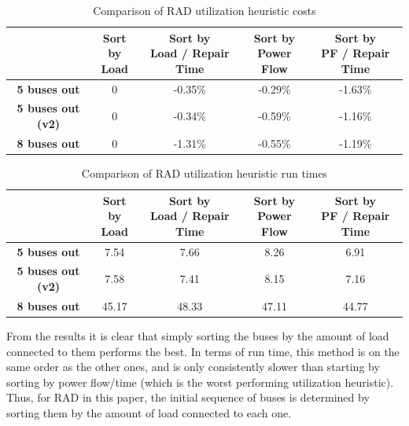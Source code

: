 \documentclass[12pt]{article}
\begin{document}
\begin{table}[ht]
    \centering
    \begin{tabular}{|c|c|c|c|c|}
        \hline
        & \makecell{Sort by \\ Load} 
        & \makecell{Sort by \\ Load / Repair Time} 
        & \makecell{Sort by \\ Power Flow} 
        & \makecell{Sort by \\ PF / Repair Time} \\
        \hline
        \textbf{5 buses out} & 0 & -0.35\% & -0.29\% & -1.63\% \\
        \hline
        \textbf{5 buses out (v2)} & 0 & -0.34\% & -0.59\% & -1.16\% \\
        \hline
        \textbf{8 buses out} & 0 & -1.31\% & -0.55\% & -1.19\% \\
        \hline
    \end{tabular}
    \caption{Comparison of RAD utilization heuristic costs}
    \label{tab:rad_results}
\end{table}

\begin{table}[ht]
    \centering
    \renewcommand{\arraystretch}{1.2} %
    \begin{tabular}{|c|c|c|c|c|}
        \hline
        & \makecell{Sort by \\ Load} 
        & \makecell{Sort by \\ Load / Repair Time} 
        & \makecell{Sort by \\ Power Flow} 
        & \makecell{Sort by \\ PF / Repair Time} \\
        \hline
        \textbf{5 buses out} & 7.54 & 7.66 & 8.26 & 6.91 \\
        \hline
        \textbf{5 buses out (v2)} & 7.58 & 7.41 & 8.15 & 7.16 \\
        \hline
        \textbf{8 buses out} & 45.17 & 48.33 & 47.11 & 44.77 \\
        \hline
    \end{tabular}
    \caption{Comparison of RAD utilization heuristic run times}
    \label{tab:rad_times}
\end{table}

From the results it is clear that simply sorting the buses by the amount of load connected to them performs the best. In terms of run time, this method is on the same order as the other ones, and is only consistently slower than starting by sorting by power flow/time (which is the worst performing utilization heuristic). Thus, for RAD in this paper, the initial sequence of buses is determined by sorting them by the amount of load connected to each one.
\end{document}
